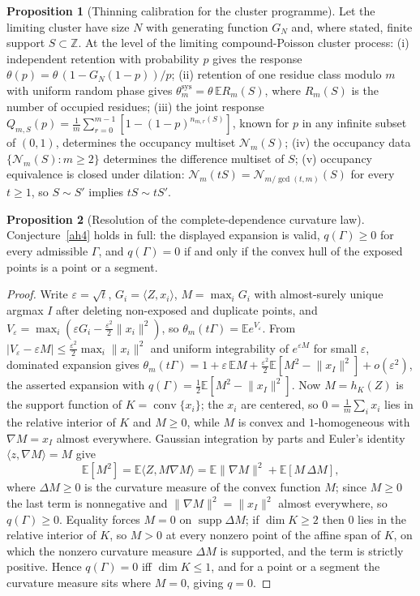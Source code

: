 \documentclass[11pt]{article}
\theoremstyle{definition}
\newcommand{\E}{\mathbb E}
\newcommand{\Z}{\mathbb Z}
\newcommand{\eps}{\varepsilon}
\providecommand{\Z}{\mathbb Z}
\providecommand{\E}{\mathbb E}
\newtheorem{proposition}{Proposition}
\begin{document}
\begin{proposition}[Thinning calibration for the cluster programme]\label{ah:thin}
Let the limiting cluster have size $N$ with generating function $G_N$ and, where stated, finite support $S\subset\Z$.  At the level of the limiting compound-Poisson cluster process:
(i) independent retention with probability $p$ gives the response $\theta(p)=\theta\,(1-G_N(1-p))/p$;
(ii) retention of one residue class modulo $m$ with uniform random phase gives $\theta^{\mathrm{sys}}_m=\theta\,\E R_m(S)$, where $R_m(S)$ is the number of occupied residues;
(iii) the joint response $Q_{m,S}(p)=\tfrac1m\sum_{r=0}^{m-1}[1-(1-p)^{n_{m,r}(S)}]$, known for $p$ in any infinite subset of $(0,1)$, determines the occupancy multiset $\mathcal N_m(S)$;
(iv) the occupancy data $\{\mathcal N_m(S):m\ge2\}$ determines the difference multiset of $S$;
(v) occupancy equivalence is closed under dilation: $\mathcal N_m(tS)=\mathcal N_{m/\gcd(t,m)}(S)$ for every $t\ge1$, so $S\sim S'$ implies $tS\sim tS'$.
\end{proposition}

\begin{proposition}[Resolution of the complete-dependence curvature law]\label{ah:curv}
Conjecture~\ref{ah4} holds in full: the displayed expansion is valid, $q(\Gamma)\ge0$ for every admissible $\Gamma$, and $q(\Gamma)=0$ if and only if the convex hull of the exposed points is a point or a segment.
\end{proposition}

\begin{proof}
Write $\eps=\sqrt t$, $G_i=\langle Z,x_i\rangle$, $M=\max_iG_i$ with almost-surely unique argmax $I$ after deleting non-exposed and duplicate points, and $V_\eps=\max_i(\eps G_i-\tfrac{\eps^2}2\lVert x_i\rVert^2)$, so $\theta_m(t\Gamma)=\E e^{V_\eps}$.  From $|V_\eps-\eps M|\le\tfrac{\eps^2}2\max_i\lVert x_i\rVert^2$ and uniform integrability of $e^{\eps M}$ for small $\eps$, dominated expansion gives $\theta_m(t\Gamma)=1+\eps\,\E M+\tfrac{\eps^2}2\E[M^2-\lVert x_I\rVert^2]+o(\eps^2)$, the asserted expansion with $q(\Gamma)=\tfrac12\E[M^2-\lVert x_I\rVert^2]$.  Now $M=h_K(Z)$ is the support function of $K=\operatorname{conv}\{x_i\}$; the $x_i$ are centered, so $0=\tfrac1m\sum_ix_i$ lies in the relative interior of $K$ and $M\ge0$, while $M$ is convex and $1$-homogeneous with $\nabla M=x_I$ almost everywhere.  Gaussian integration by parts and Euler's identity $\langle z,\nabla M\rangle=M$ give
\[
\E[M^2]=\E\langle Z,M\nabla M\rangle=\E\lVert\nabla M\rVert^2+\E[M\,\Delta M],
\]
where $\Delta M\ge0$ is the curvature measure of the convex function $M$; since $M\ge0$ the last term is nonnegative and $\lVert\nabla M\rVert^2=\lVert x_I\rVert^2$ almost everywhere, so $q(\Gamma)\ge0$.  Equality forces $M=0$ on $\operatorname{supp}\Delta M$; if $\dim K\ge2$ then $0$ lies in the relative interior of $K$, so $M>0$ at every nonzero point of the affine span of $K$, on which the nonzero curvature measure $\Delta M$ is supported, and the term is strictly positive.  Hence $q(\Gamma)=0$ iff $\dim K\le1$, and for a point or a segment the curvature measure sits where $M=0$, giving $q=0$.
\end{proof}
\end{document}
